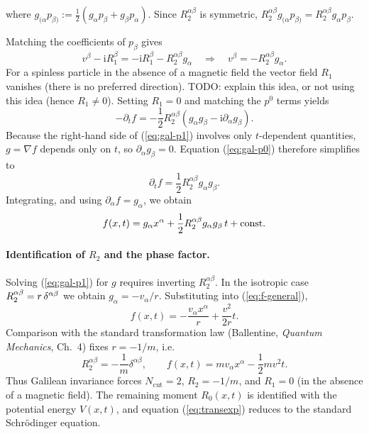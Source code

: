 \documentclass{book}
\newcommand{\assign}{:=}
\newcommand{\mathi}{\mathrm{i}}
\newcommand{\tmem}[1]{{\em #1\/}}
\newcommand{\tmop}[1]{\ensuremath{\operatorname{#1}}}
\begin{document}
where $g_{(\alpha} p_{\beta)} \assign \tfrac{1}{2} (g_{\alpha} p_{\beta} +
g_{\beta} p_{\alpha})$. Since $R_2^{\alpha \beta}$ is symmetric, $R_2^{\alpha
\beta} g_{(\alpha} p_{\beta)} = R_2^{\alpha \beta} g_{\alpha} p_{\beta}$.

Matching the coefficients of $p_{\beta}$ gives
\begin{equation}
  v^{\beta} - \mathi R_1^{\beta} = - \mathi R_1^{\beta} - R_2^{\alpha \beta}
  g_{\alpha} \quad \Longrightarrow \quad v^{\beta} = - R_2^{\alpha \beta}
  g_{\alpha} . \label{eq:gal-p1}
\end{equation}
For a spinless particle in the absence of a magnetic field the vector field
$R_1$ vanishes (there is no preferred direction). TODO: explain this idea, or not using this idea (hence $R_1 \neq 0$). Setting $R_1 = 0$ and
matching the $p^0$ terms yields
\begin{equation}
  - \partial_t f = - \frac{1}{2} R_2^{\alpha \beta}  (g_{\alpha} g_{\beta} -
  \mathi \partial_{\alpha} g_{\beta}) . \label{eq:gal-p0}
\end{equation}
Because the right-hand side of (\ref{eq:gal-p1}) involves only $t$-dependent
quantities, $g = \nabla f$ depends only on $t$, so $\partial_{\alpha}
g_{\beta} = 0$. Equation (\ref{eq:gal-p0}) therefore simplifies to
\[ \partial_t f = \frac{1}{2} R_2^{\alpha \beta} g_{\alpha} g_{\beta} . \]
Integrating, and using $\partial_{\alpha} f = g_{\alpha}$, we obtain
\begin{equation}
  f (x, t) = g_{\alpha} x^{\alpha} + \frac{1}{2} R_2^{\alpha \beta} g_{\alpha}
  g_{\beta}  \hspace{0.17em} t + \text{const} . \label{eq:f-general}
\end{equation}
\paragraph{Identification of $R_2$ and the phase factor.} Solving
(\ref{eq:gal-p1}) for $g$ requires inverting $R_2^{\alpha \beta}$. In the
isotropic case $R_2^{\alpha \beta} = r \hspace{0.17em} \delta^{\alpha \beta}$
we obtain $g_{\alpha} = - v_{\alpha} / r$. Substituting into
(\ref{eq:f-general}),
\[ f (x, t) = - \frac{v_{\alpha} x^{\alpha}}{r} + \frac{v^2}{2 r} t. \]
Comparison with the standard transformation law (Ballentine, {\tmem{Quantum
Mechanics}}, Ch.~4) fixes $r = - 1 / m$, i.e.
\[ \boxed{R_2^{\alpha \beta} = - \frac{1}{m} \delta^{\alpha \beta}}, \qquad
   \boxed{f (x, t) = mv_{\alpha} x^{\alpha} - \frac{1}{2} mv^2 t} . \]
Thus Galilean invariance forces $N_{\tmop{cut}} = 2$, $R_2 = - 1 / m$, and
$R_1 = 0$ (in the absence of a magnetic field). The remaining moment $R_0  (x,
t)$ is identified with the potential energy $V (x, t)$, and equation
(\ref{eq:transexp}) reduces to the standard Schrödinger equation.
\end{document}
